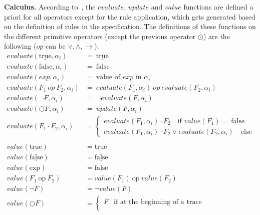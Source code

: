 \documentclass[english]{article}
\begin{document}
\textbf{Calculus.} According to~\cite{barringer2004rule}, the $evaluate$, $update$ and $value$ functions are defined a priori for all operators except for the rule application, which gets generated based on the definition of rules in the specification. The definitions of these functions on the different primitive operators (except the previous operator $\odot$) are the following ($op\text{ can be }\lor , \land, \rightarrow $):
{\allowdisplaybreaks
\begin{align*}
    evaluate(\underline{\text{true}},\alpha_i) & =\ \underline{\text{true}} \\
    evaluate(\underline{\text{false}},\alpha_i) & =\ \underline{\text{false}} \\ 
    evaluate(exp,\alpha_i) & =\ \text{value of } exp\text{ in } \alpha_i \\
    evaluate(F_1\ op\ F_2,\alpha_i) & =\  evaluate(F_1,\alpha_i)\ op\ evaluate(F_2,\alpha_i)\\
    evaluate(\neg{F},\alpha_i) & =\ \neg{evaluate(F,\alpha_i)}  \\
    evaluate(\bigcirc F,\alpha_i) & =\ update(F,\alpha_i)  \\
    evaluate(F_1 \cdot F_2,\alpha_i) & =
    \begin{cases}
        evaluate(F_1,\alpha_i)\cdot F_2 \quad \text{if } value(F_1)=\ \underline{\text{false}} \\
        evaluate(F_1,\alpha_i)\cdot F_2 \lor evaluate(F_2,\alpha_i)\quad \text{else} 
    \end{cases} \\ \\
        value(\underline{\text{true}}) & = \underline{\text{true}} \\
        value(\underline{\text{false}}) & = \underline{\text{false}} \\ 
        value(\text{exp}) & = \underline{\text{false}} \\
        value(F_1\ \text{op}\ F_2) & = value(F_1)\ \text{op}\ value(F_2) \\
        value(\neg{F}) & = \neg{value(F)}  \\
        value(\bigcirc F) & =
        \begin{cases}
            F & \text{if at the beginning of a trace} \\

\end{cases}
\end{align*}}
\end{document}
